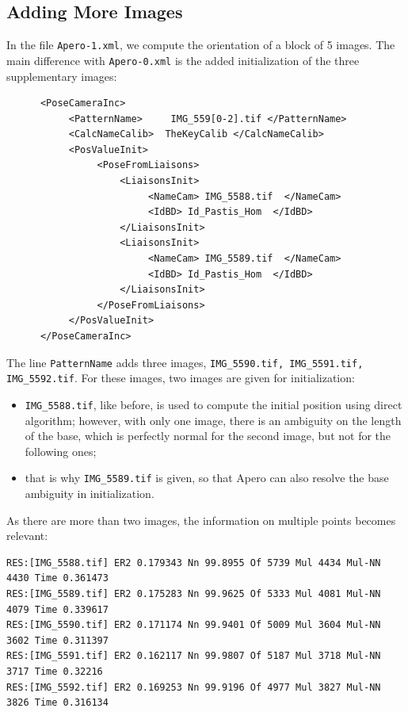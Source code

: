 \subsection{Adding More Images}

In the file {\tt Apero-1.xml}, we compute the orientation of a block of
5 images.  The main difference with {\tt Apero-0.xml} is the added
initialization of the three supplementary images:

{\scriptsize
\begin{verbatim}
      <PoseCameraInc>
           <PatternName>     IMG_559[0-2].tif </PatternName>
           <CalcNameCalib>  TheKeyCalib </CalcNameCalib>
           <PosValueInit>
                <PoseFromLiaisons>
                    <LiaisonsInit>
                         <NameCam> IMG_5588.tif  </NameCam>
                         <IdBD> Id_Pastis_Hom  </IdBD>
                    </LiaisonsInit>
                    <LiaisonsInit>
                         <NameCam> IMG_5589.tif  </NameCam>
                         <IdBD> Id_Pastis_Hom  </IdBD>
                    </LiaisonsInit>
                </PoseFromLiaisons>
           </PosValueInit>
      </PoseCameraInc>
\end{verbatim}
}

The line {\tt PatternName} adds three images, {\tt  IMG\_5590.tif,
IMG\_5591.tif, IMG\_5592.tif}. For these images, two images are
given for initialization:

\begin{itemize}
   \item {\tt IMG\_5588.tif}, like before, is used to compute the
        initial position using direct algorithm; however, with only
        one image, there is an ambiguity on the length of the base,
        which is perfectly normal for the second image, but not for
        the following ones;

   \item that is why {\tt IMG\_5589.tif} is given, so that Apero can also
         resolve the base ambiguity in initialization.

\end{itemize}


As there are more than two images, the information on multiple points
becomes relevant:

{\scriptsize
\begin{verbatim}
RES:[IMG_5588.tif] ER2 0.179343 Nn 99.8955 Of 5739 Mul 4434 Mul-NN 4430 Time 0.361473
RES:[IMG_5589.tif] ER2 0.175283 Nn 99.9625 Of 5333 Mul 4081 Mul-NN 4079 Time 0.339617
RES:[IMG_5590.tif] ER2 0.171174 Nn 99.9401 Of 5009 Mul 3604 Mul-NN 3602 Time 0.311397
RES:[IMG_5591.tif] ER2 0.162117 Nn 99.9807 Of 5187 Mul 3718 Mul-NN 3717 Time 0.32216
RES:[IMG_5592.tif] ER2 0.169253 Nn 99.9196 Of 4977 Mul 3827 Mul-NN 3826 Time 0.316134
\end{verbatim}
}

